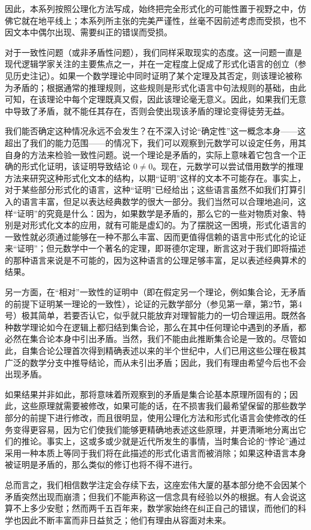 因此，本系列按照公理化方法写成，始终把完全形式化的可能性置于视野之中，仿佛它就在地平线上；本系列所主张的完美严谨性，丝毫不因前述考虑而受损，也不因文本中偶尔出现、需要纠正的错误而受损。

对于一致性问题（或非矛盾性问题），我们同样采取现实的态度。这一问题一直是现代逻辑学家关注的主要焦点之一，并在一定程度上促成了形式化语言的创立（参见历史注记）。如果一个数学理论中同时证明了某个定理及其否定，则该理论被称为矛盾的；根据通常的推理规则，这些规则是形式化语言中句法规则的基础，由此可知，在该理论中每个定理既真又假，因此该理论毫无意义。因此，如果我们无意中导致了矛盾，就不能任其存在，否则会使出现该矛盾的理论变得徒劳无益。

我们能否确定这种情况永远不会发生？在不深入讨论“确定性”这一概念本身——这超出了我们的能力范围——的情况下，我们可以观察到元数学可以设定任务，用其自身的方法来检验一致性问题。说一个理论是矛盾的，实际上意味着它包含一个正确的形式化证明，该证明导致结论 \(0 \neq 0\)。现在，元数学可以尝试借用数学的推理方法来研究这种形式化文本的结构，以期“证明”这样的文本不可能存在。事实上，对于某些部分形式化的语言，这种“证明”已经给出；这些语言虽然不如我们打算引入的语言丰富，但足以表达经典数学的很大一部分。我们当然可以合理地追问，这样“证明”的究竟是什么：因为，如果数学是矛盾的，那么它的一些对物质对象、特别是对形式化文本的应用，就有可能是虚幻的。为了摆脱这一困境，形式化语言的一致性就必须通过能够在一种不那么丰富、因而更值得信赖的语言中形式化的论证来“证明”；但元数学中一个著名的定理，即哥德尔定理，断言这对于我们即将描述的那种语言来说是不可能的，因为这种语言的公理足够丰富，足以表述经典算术的结果。

另一方面，在“相对”一致性的证明中（即在假定另一个理论，例如集合论，无矛盾的前提下证明某一理论的一致性），论证的元数学部分（参见第一章，第2节，第4号）极其简单，若要否认它，似乎就只能放弃对理智能力的一切合理运用。既然各种数学理论如今在逻辑上都归结到集合论，那么在其中任何理论中遇到的矛盾，都必然在集合论本身中引出矛盾。当然，我们不能由此推断集合论是一致的。尽管如此，自集合论公理首次得到精确表述以来的半个世纪中，人们已用这些公理在极其广泛的数学分支中推导结论，而从未引出矛盾；因此，我们有理由希望今后也不会出现矛盾。

如果结果并非如此，那将意味着所观察到的矛盾是集合论基本原理所固有的；因此，这些原理就需要被修改，如果可能的话，在不损害我们最希望保留的那些数学部分的前提下进行修改，而且很明显，使用公理化方法和形式化语言会使修改的任务变得更容易，因为它们使我们能够更精确地表述这些原理，并更清晰地分离出它们的推论。事实上，这或多或少就是近代所发生的事情，当时集合论的“悖论”通过采用一种本质上等同于我们将在此描述的形式化语言而被消除；如果这种语言本身被证明是矛盾的，那么类似的修订也将不得不进行。

总而言之，我们相信数学注定会存续下去，这座宏伟大厦的基本部分绝不会因某个矛盾突然出现而崩溃；但我们不能声称这一信念具有经验以外的根据。有人会说这算不上多少安慰；然而两千五百年来，数学家始终在纠正自己的错误，而他们的科学也因此不断丰富而非日益贫乏；他们有理由从容面对未来。
